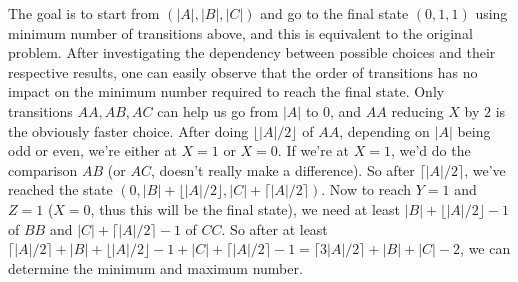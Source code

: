 \documentclass[letterpaper,12pt]{article}
\begin{document}
\begin{enumerate}
\begin{enumerate}
	The goal is to start from $(|A|, |B|, |C|)$ and go to the final state $(0, 1, 1)$ using minimum number of transitions above, and this is equivalent to the original problem. After investigating the dependency between possible choices and their respective results, one can easily observe that the order of transitions has no impact on the minimum number required to reach the final state. Only transitions $AA, AB, AC$ can help us go from $|A|$ to $0$, and $AA$ reducing $X$ by $2$ is the obviously faster choice. After doing $\lfloor |A|/2 \rfloor$ of $AA$, depending on $|A|$ being odd or even, we're either at $X=1$ or $X=0$. If we're at $X=1$, we'd do the comparison $AB$ (or $AC$, doesn't really make a difference). So after $\lceil |A|/2 \rceil$, we've reached the state $(0, |B|+\lfloor |A|/2 \rfloor, |C|+\lceil |A|/2 \rceil)$. Now to reach $Y=1$ and $Z=1$ ($X=0$, thus this will be the final state), we need at least $|B|+\lfloor |A|/2 \rfloor -1$ of $BB$ and $|C|+\lceil |A|/2 \rceil-1$ of $CC$. So after at least $\lceil |A|/2 \rceil + |B|+\lfloor |A|/2 \rfloor -1 + |C|+\lceil |A|/2 \rceil-1  = \lceil 3|A|/2 \rceil+|B|+|C|-2$, we can determine the minimum and maximum number.



\end{enumerate}
\end{enumerate}
\end{document}

